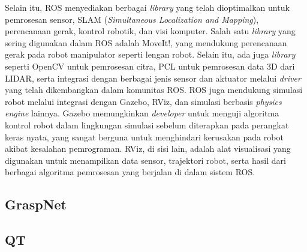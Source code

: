 Selain itu, ROS menyediakan berbagai \emph{library} yang telah dioptimalkan untuk pemrosesan sensor,
SLAM (\emph{Simultaneous Localization and Mapping}), perencanaan gerak, kontrol robotik, dan visi komputer.
Salah satu \emph{library} yang sering digunakan dalam ROS adalah MoveIt!, yang mendukung perencanaan gerak
pada robot manipulator seperti lengan robot. Selain itu, ada juga \emph{library} seperti OpenCV untuk
pemrosesan citra, PCL untuk pemrosesan data 3D dari LIDAR, serta integrasi dengan
berbagai jenis sensor dan aktuator melalui \emph{driver} yang telah dikembangkan dalam komunitas ROS.
ROS juga mendukung simulasi robot melalui integrasi dengan Gazebo, RViz, dan simulasi berbasis \emph{physics engine} lainnya.
Gazebo memungkinkan \emph{developer} untuk menguji algoritma kontrol robot dalam lingkungan simulasi sebelum diterapkan pada
perangkat keras nyata, yang sangat berguna untuk menghindari kerusakan pada robot akibat kesalahan pemrograman. RViz,
di sisi lain, adalah alat visualisasi yang digunakan untuk menampilkan data sensor, trajektori robot, serta hasil dari
berbagai algoritma pemrosesan yang berjalan di dalam sistem ROS.

\subsection{GraspNet}

\subsection{QT}